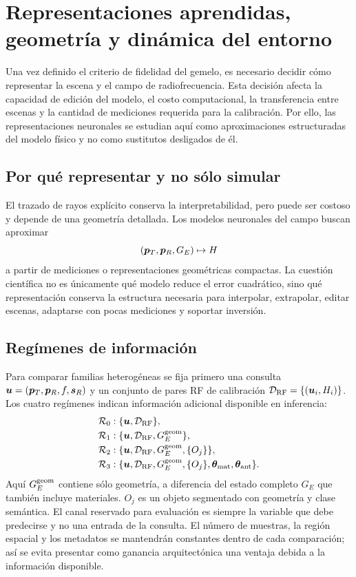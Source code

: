 \chapter{Representaciones aprendidas, geometría y dinámica del entorno}
\label{ch:latent_env}

Una vez definido el criterio de fidelidad del gemelo, es necesario decidir cómo representar
la escena y el campo de radiofrecuencia. Esta decisión afecta la capacidad de edición del
modelo, el costo computacional, la transferencia entre escenas y la cantidad de mediciones
requerida para la calibración. Por ello, las representaciones neuronales se estudian aquí
como aproximaciones estructuradas del modelo físico y no como sustitutos desligados de él.

\section{Por qué representar y no sólo simular}

El trazado de rayos explícito conserva la interpretabilidad, pero puede ser costoso y depende de una geometría detallada. Los modelos neuronales del campo buscan aproximar
\begin{equation}
(\bm{p}_T,\bm{p}_R,G_E)\mapsto H
\end{equation}
a partir de mediciones o representaciones geométricas compactas. La cuestión científica no es únicamente qué modelo reduce el error cuadrático, sino qué representación conserva la estructura necesaria para interpolar, extrapolar, editar escenas, adaptarse con pocas mediciones y soportar inversión.

\section{Regímenes de información}

Para comparar familias heterogéneas se fija primero una consulta $\bm{u}=(\bm{p}_T,\bm{p}_R,f,\bm{s}_R)$ y un conjunto de pares RF de calibración $\mathcal D_{\rm RF}=\{(\bm{u}_i,H_i)\}$. Los cuatro regímenes indican información adicional disponible en inferencia:
\begin{align}
\mathcal R_0 &: \{\bm{u},\mathcal D_{\rm RF}\},\\
\mathcal R_1 &: \{\bm{u},\mathcal D_{\rm RF},G_E^{\rm geom}\},\\
\mathcal R_2 &: \{\bm{u},\mathcal D_{\rm RF},G_E^{\rm geom},\{O_j\}\},\\
\mathcal R_3 &: \{\bm{u},\mathcal D_{\rm RF},G_E^{\rm geom},\{O_j\},
\bm{\theta}_{\rm mat},\bm{\theta}_{\rm ant}\}.
\end{align}
Aquí $G_E^{\rm geom}$ contiene sólo geometría, a diferencia del estado
completo $G_E$ que también incluye materiales. $O_j$ es un objeto segmentado con geometría y clase semántica. El canal reservado para evaluación es siempre la variable que debe predecirse y no una entrada de la consulta. El número de muestras, la región espacial y los metadatos se mantendrán constantes dentro de cada comparación; así se evita presentar como ganancia arquitectónica una ventaja debida a la información disponible.

